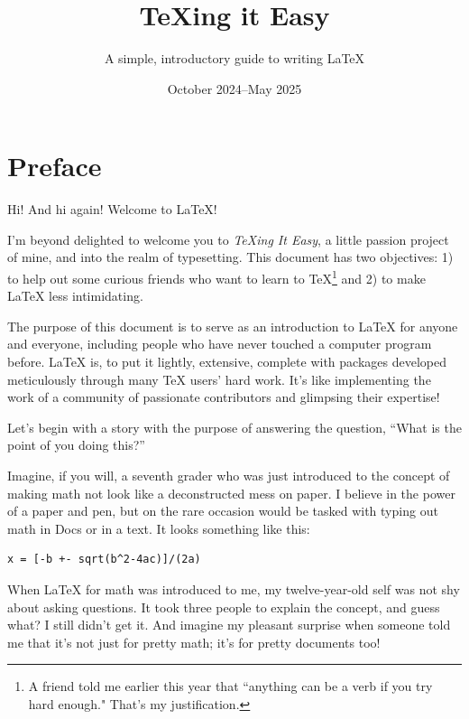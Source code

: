 \documentclass[letterpaper, 12pt]{article}
\title{\TeX ing it Easy}
\author{A simple, introductory guide to writing \LaTeX}
\date{October 2024--May 2025}
\begin{document}
\maketitle

\tableofcontents

\fancyhf{}
\fancyfoot[C]{\thepage}

\nocite{*}

\newpage

\section*{Preface}

\fancyhf{}
\fancyfoot[C]{\thepage}


Hi! And hi again! Welcome to \LaTeX!

I'm beyond delighted to welcome you to \textit{\TeX ing It Easy}, a little passion project of mine, and into the realm of typesetting. This document has two objectives: 1) to help out some curious friends who want to learn to \TeX\footnote{A friend told me earlier this year that ``anything can be a verb if you try hard enough." That's my justification.} and 2) to make \LaTeX{} less intimidating.

The purpose of this document is to serve as an introduction to \LaTeX{} for anyone and everyone, including people who have never touched a computer program before. \LaTeX{} is, to put it lightly, extensive, complete with packages developed meticulously through many \TeX{} users' hard work. It's like implementing the work of a community of passionate contributors and glimpsing their expertise!

Let's begin with a story with the purpose of answering the question, ``What is the point of you doing this?''

Imagine, if you will, a seventh grader who was just introduced to the concept of making math not look like a deconstructed mess on paper. I believe in the power of a paper and pen, but on the rare occasion would be tasked with typing out math in Docs or in a text. It looks something like this:

\begin{verbatim}
x = [-b +- sqrt(b^2-4ac)]/(2a)
\end{verbatim}

When \LaTeX{} for math was introduced to me, my twelve-year-old self was not shy about asking questions. It took three people to explain the concept, and guess what? I still didn't get it. And imagine my pleasant surprise when someone told me that it's not just for pretty math; it's for pretty documents too!
\end{document}
